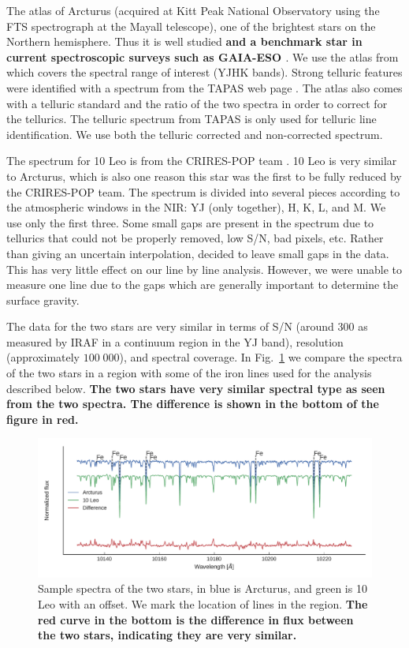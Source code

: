 \documentclass{aa}
\begin{document}
The atlas of Arcturus (acquired at Kitt Peak National Observatory using the FTS
spectrograph at the Mayall telescope), one of the brightest stars on the
Northern hemisphere. Thus it is well studied \citep[see e.g.][to mention just a
few]{Griffin1967,McWilliam1990,Ramirez2013} {\bf and a benchmark star in current
spectroscopic surveys such as GAIA-ESO \citep{}}. We use the atlas from
\citet{Hinkle1995a} which covers the spectral range of interest (YJHK bands).
Strong telluric features were identified with a spectrum from the TAPAS web page
\citep{Bertaux2014}. The atlas also comes with a telluric standard and the ratio
of the two spectra in order to correct for the tellurics. The telluric spectrum
from TAPAS is only used for telluric line identification. We use both the
telluric corrected and non-corrected spectrum.

The spectrum for 10 Leo is from the CRIRES-POP team \citep{Nicholls2017}. 10 Leo
is very similar to Arcturus, which is also one reason this star was the first to
be fully reduced by the CRIRES-POP team. The spectrum is divided into several
pieces according to the atmospheric windows in the NIR: YJ (only together), H,
K, L, and M. We use only the first three. Some small gaps are present in the
spectrum due to tellurics that could not be properly removed, low S/N, bad
pixels, etc. Rather than giving an uncertain interpolation, \citet{Nicholls2017}
decided to leave small gaps in the data. This has very little effect on our line
by line analysis. However, we were unable to measure one  line due
to the gaps which are generally important to determine the surface gravity.

The data for the two stars are very similar in terms of S/N (around 300 as
measured by IRAF in a continuum region in the YJ band), resolution
(approximately $100\;000$), and spectral coverage. In Fig.~\ref{fig:both} we
compare the spectra of the two stars in a region with some of the iron lines
used for the analysis described below. {\bf The two stars have very similar
spectral type as seen from the two spectra. The difference is shown in the
bottom of the figure in red.}

\begin{figure}[htpb!]
    \centering
    \includegraphics[width=1.0\linewidth]{figures/bothspectra.pdf}
    \caption{Sample spectra of the two stars, in blue is Arcturus, and green is
             10 Leo with an offset. We mark the location of  lines in
             the region. {\bf The red curve in the bottom is the difference in
             flux between the two stars, indicating they are very similar.}}
    \label{fig:both}
\end{figure}
\end{document}
